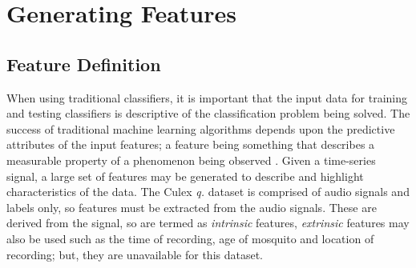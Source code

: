 \section{Generating Features}
\label{sec:pl-feats}
    \subsection{Feature Definition}
    \label{subsec:pl-feats-def}
        When using traditional classifiers, it is important that the input data for training and testing classifiers is descriptive of the classification problem being solved. The success of traditional machine learning algorithms depends upon the predictive attributes of the input features; a feature being something that describes a measurable property of a phenomenon being observed \cite{Bishop2006}. Given a time-series signal, a large set of features may be generated to describe and highlight characteristics of the data. The Culex \textit{q.} dataset is comprised of audio signals and labels only, so features must be extracted from the audio signals. These are derived from the signal, so are termed as \textit{intrinsic} features, \textit{extrinsic} features may also be used such as the time of recording, age of mosquito and location of recording; but, they are unavailable for this dataset.
        
